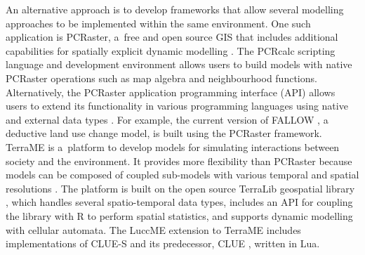 \documentclass{icldt}\usepackage[]{graphicx}\usepackage[]{color}
\begin{document}
An alternative approach is to develop frameworks that allow several modelling approaches to be implemented within the same environment. One such application is PCRaster, a~free and open source GIS that includes additional capabilities for spatially explicit dynamic modelling \citep{schmitz2009}. The PCRcalc scripting language and development environment allows users to build models with native PCRaster operations such as map algebra and neighbourhood functions. Alternatively, the PCRaster application programming interface (API) allows users to extend its functionality in various programming languages using native and external data types \citep{schmitz2009}. For example, the current version of FALLOW \citep{vannoordwijk2002,mulia2014}, a deductive land use change model, is built using the PCRaster framework. TerraME \citep{carneiro2013} is a~platform to develop models for simulating interactions between society and the environment. It provides more flexibility than PCRaster because models can be composed of coupled sub-models with various temporal and spatial resolutions \citep{moreira2009,carneiro2013}. The platform is built on the open source TerraLib geospatial library \citep{camara2008}, which handles several spatio-temporal data types, includes an API for coupling the library with R \citep{R2014} to perform spatial statistics, and supports dynamic modelling with cellular automata. The LuccME extension to TerraME includes implementations of CLUE-S and its predecessor, CLUE \citep{veldkamp1996,verburg1999}, written in Lua. \\
\end{document}

